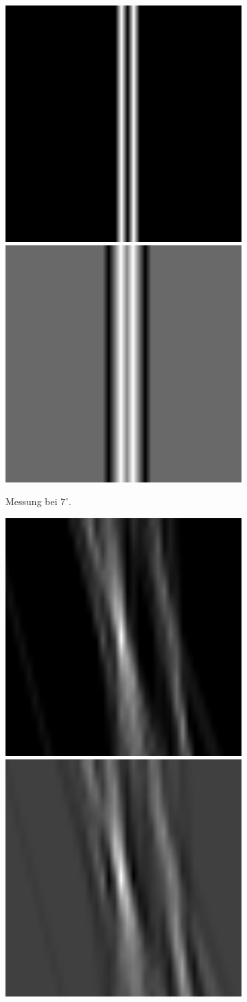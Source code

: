 \documentclass[slug=PET, room=Andreas-Schubert-Bau\,\ 424A, supervisor=Carsten\ Bittrich, coursedate=10.\ 01.\ 2020]{../../Lab_Report_LaTeX/lab_report}
\begin{document}
\begin{figure}
   \begin{subfigure}{0.5\textwidth}
	   	\centering
   		\includegraphics[width=.4\textwidth]{../messungen/oliTOM1/1_einfach.png}
		\includegraphics[width=.4\textwidth]{../messungen/oliTOM1/1_gefiltert.png}
		\caption{Messung bei \(7^\circ\).}
	\end{subfigure}
	\begin{subfigure}{0.5\textwidth}
		\centering
		\includegraphics[width=.4\textwidth]{../messungen/oliTOM1/3_einfach.png}
		\includegraphics[width=.4\textwidth]{../messungen/oliTOM1/3_gefiltert.png}

\end{subfigure}
\end{figure}
\end{document}
